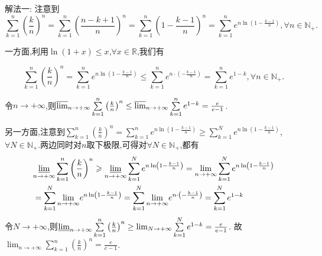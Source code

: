 \documentclass[lang=cn,newtx,10pt,scheme=chinese]{elegantbook}
\begin{document}
\begin{solution}
{\color{blue}解法一:}
注意到
\[
\sum\limits_{k = 1}^{n}\left(\frac{k}{n}\right)^n = \sum\limits_{k = 1}^{n}\left(\frac{n - k + 1}{n}\right)^n = \sum\limits_{k = 1}^{n}\left(1 - \frac{k - 1}{n}\right)^n = \sum\limits_{k = 1}^{n}e^{n\ln\left(1 - \frac{k - 1}{n}\right)},  \forall n \in \mathbb{N}_+.
\]

一方面,利用\(\ln(1 + x) \leq x\),\(\forall x \in \mathbb{R}\),我们有

\[
\sum\limits_{k = 1}^{n}\left(\frac{k}{n}\right)^n = \sum\limits_{k = 1}^{n}e^{n\ln\left(1 - \frac{k - 1}{n}\right)} \leq \sum\limits_{k = 1}^{n}e^{n\cdot\left(-\frac{k - 1}{n}\right)} = \sum\limits_{k = 1}^{n}e^{1 - k},  \forall n \in \mathbb{N}_+.
\]

令\(n \to +\infty\),则\(\varlimsup_{n \to +\infty}\sum\limits_{k = 1}^{n}\left(\frac{k}{n}\right)^n \leq \varlimsup_{n \to +\infty}\sum\limits_{k = 1}^{n}e^{1 - k} = \frac{e}{e - 1}\).

另一方面,注意到\(\sum\limits_{k = 1}^{n}\left(\frac{k}{n}\right)^n = \sum\limits_{k = 1}^{n}e^{n\ln\left(1 - \frac{k - 1}{n}\right)} \geq \sum\limits_{k = 1}^{N}e^{n\ln\left(1 - \frac{k - 1}{n}\right)}\),\(\forall N \in \mathbb{N}_+\).两边同时对\(n\)取下极限,可得对\(\forall N \in \mathbb{N}_+\),都有
\begin{align*}
&\underset{n\rightarrow +\infty}{{\varliminf }}\sum\limits_{k=1}^n{\left( \frac{k}{n} \right) ^n}\geqslant \underset{n\rightarrow +\infty}{{\varliminf }}\sum\limits_{k=1}^N{e^{n\ln \left( 1-\frac{k-1}{n} \right)}}=\underset{n\rightarrow +\infty}{\lim}\sum\limits_{k=1}^N{e^{n\ln \left( 1-\frac{k-1}{n} \right)}}
\\
&=\sum\limits_{k=1}^N{\underset{n\rightarrow +\infty}{\lim}e^{n\ln \left( 1-\frac{k-1}{n} \right)}}=\sum\limits_{k=1}^N{\underset{n\rightarrow +\infty}{\lim}e^{n\cdot \left( -\frac{k-1}{n} \right)}}=\sum\limits_{k=1}^N{e^{1-k}}
\end{align*}
令\(N \to +\infty\),则\(\varliminf_{n \to +\infty}\sum\limits_{k = 1}^{n}\left(\frac{k}{n}\right)^n \geq \lim_{N \to +\infty}\sum\limits_{k = 1}^{N}e^{1 - k} = \frac{e}{e - 1}\).
故\(\lim_{n \to +\infty}\sum\limits_{k = 1}^{n}\left(\frac{k}{n}\right)^n = \frac{e}{e - 1}\). 


\end{solution}
\end{document}
